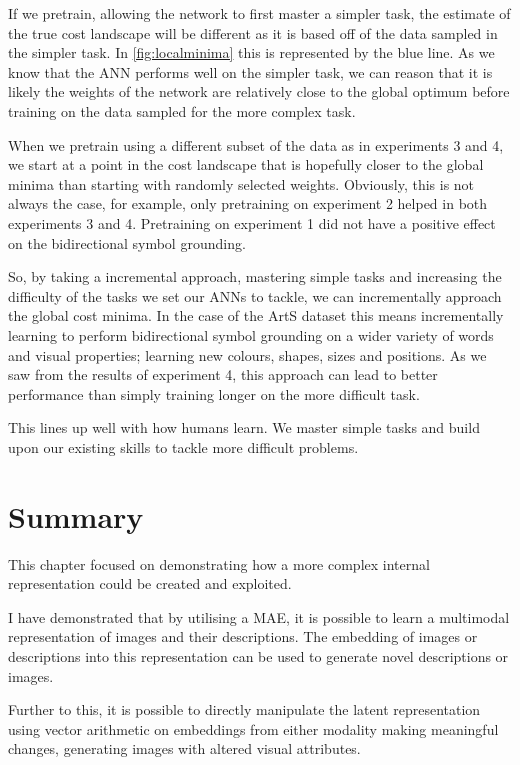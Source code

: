 If we pretrain, allowing the network to first master a simpler task, the estimate of the true cost landscape will be different as it is based off of the data sampled in the simpler task. In \autoref{fig:localminima} this is represented by the blue line. As we know that the \ac{ANN} performs well on the simpler task, we can reason that it is likely the weights of the network are relatively close to the global optimum before training on the data sampled for the more complex task.


When we pretrain using a different subset of the data as in experiments 3 and 4, we start at a point in the cost landscape that is hopefully closer to the global minima than starting with randomly selected weights. Obviously, this is not always the case, for example, only pretraining on experiment 2 helped in both experiments 3 and 4. Pretraining on experiment 1 did not have a positive effect on the bidirectional symbol grounding.

So, by taking a incremental approach, mastering simple tasks and increasing the difficulty of the tasks we set our  \acp{ANN} to tackle, we can incrementally approach the global cost minima. In the case of the ArtS dataset this means incrementally learning to perform bidirectional symbol grounding on a wider variety of words and visual properties; learning new colours, shapes, sizes and positions. As we saw from the results of experiment 4, this approach can lead to better performance than simply training longer on the more difficult task.

This lines up well with how humans learn. We master simple tasks and build upon our existing skills to tackle more difficult problems.

\section{Summary}
This chapter focused on demonstrating how a more complex internal representation could be created and exploited.

I have demonstrated that by utilising a \ac{MAE}, it is possible to learn a multimodal representation of images and their descriptions. The embedding of images or descriptions into this representation can be used to generate novel descriptions or images.

Further to this, it is possible to directly manipulate the latent representation using vector arithmetic on embeddings from either modality making meaningful changes, generating images with altered visual attributes.

